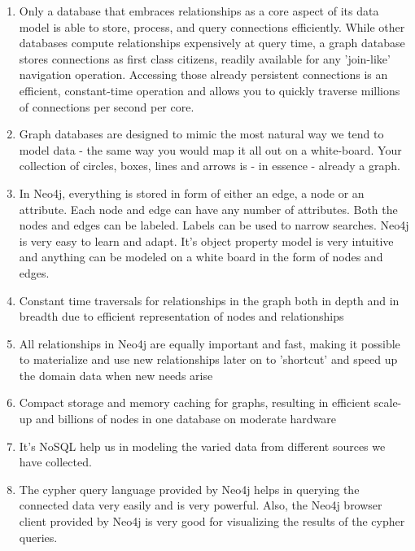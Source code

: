 \begin{enumerate}

\item Only a database that embraces relationships as a core aspect of its data model is able to store, process, and query connections efficiently. While other databases compute relationships expensively at query time, a graph database stores connections as first class citizens, readily available for any 'join-like' navigation operation. Accessing those already persistent connections is an efficient, constant-time operation and allows you to quickly traverse millions of connections per second per core. 

\item Graph databases are designed to mimic the most natural way we tend to model data - the same way you would map it all out on a white-board. Your collection of circles, boxes, lines and arrows is - in essence - already a graph. 

\item In Neo4j, everything is stored in form of either an edge, a node or an attribute. Each node and edge can have any number of attributes. Both the nodes and edges can be labeled. Labels can be used to narrow searches.  Neo4j is very easy to learn and adapt. It's object property model is very intuitive and anything can be modeled on a white board in the form of nodes and edges.

\item Constant time traversals for relationships in the graph both in depth and in breadth due to efficient representation of nodes and relationships 

\item All relationships in Neo4j are equally important and fast, making it possible to materialize and use new relationships later on to 'shortcut' and speed up the domain data when new needs arise 

\item Compact storage and memory caching for graphs, resulting in efficient scale-up and billions of nodes in one database on moderate hardware 

\item It's NoSQL help us in modeling the varied data from different sources we have collected.

\item The cypher query language provided by Neo4j helps in querying the connected data very easily and is very powerful. Also, the Neo4j browser client provided by Neo4j is very good for visualizing the results of the cypher queries.

\end{enumerate}

